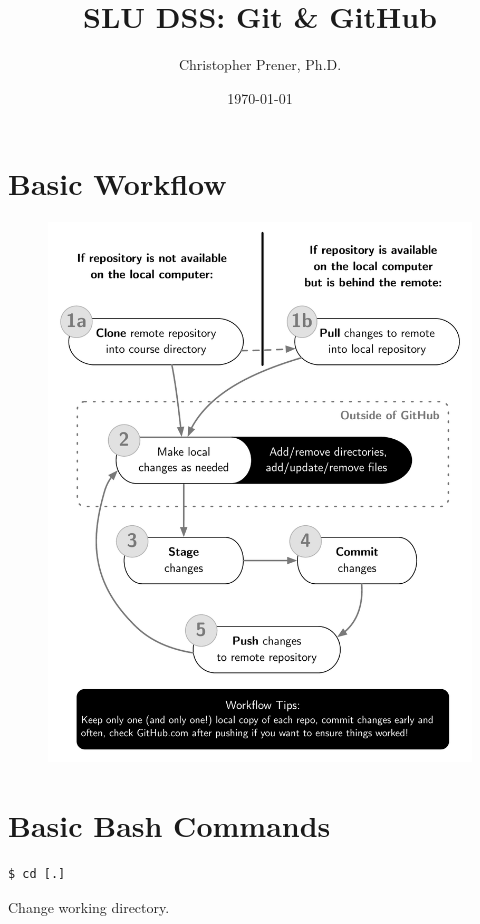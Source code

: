 \documentclass{tufte-handout}
\title{SLU DSS: Git \& GitHub}
\author{Christopher Prener, Ph.D.}
\date{\today}
\begin{document}
\maketitle %

\section{Basic Workflow}
\begin{fullwidth}
\begin{figure}[!h]
\includegraphics[scale=.68]{"git"}
\end{figure}
\end{fullwidth}


\newpage
\section{Basic Bash Commands}
\begin{lstlisting}[frame=single] 
$ cd [.]
\end{lstlisting}
Change working directory.
\end{document}

